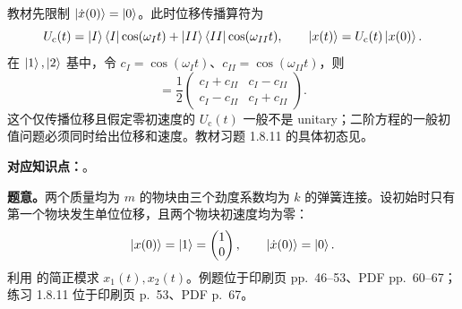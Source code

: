 \begin{checkedsolution}
教材先限制 $\left|\dot x(0)\right\rangle=\left|0\right\rangle$。此时位移传播算符为
\begin{equation}
  U_{\mathrm c}(t)
  =\left|I\right\rangle\left\langle I\right|\cos(\omega_It)
  +\left|II\right\rangle\left\langle II\right|\cos(\omega_{II}t),
  \qquad
  \left|x(t)\right\rangle=U_{\mathrm c}(t)\left|x(0)\right\rangle.
  \label{eq:QM-C01-S08-classical-propagator}
\end{equation}
在 $\left|1\right\rangle,\left|2\right\rangle$ 基中，令 $c_I=\cos(\omega_It)$、$c_{II}=\cos(\omega_{II}t)$，则
\begin{equation}
  [U_{\mathrm c}(t)]
  =\frac12
  \begin{pmatrix}
    c_I+c_{II}&c_I-c_{II}\\
    c_I-c_{II}&c_I+c_{II}
  \end{pmatrix}.
  \label{eq:QM-C01-S08-classical-propagator-matrix}
\end{equation}
这个仅传播位移且假定零初速度的 $U_{\mathrm c}(t)$ 一般不是 unitary；二阶方程的一般初值问题必须同时给出位移和速度。教材习题 1.8.11 的具体初态见。

\end{checkedsolution}


\textbf{对应知识点：}。

\textbf{题意。}两个质量均为 $m$ 的物块由三个劲度系数均为 $k$ 的弹簧连接。设初始时只有第一个物块发生单位位移，且两个物块初速度均为零：
\[
  \left|x(0)\right\rangle=\left|1\right\rangle=\begin{pmatrix}1\\0\end{pmatrix},
  \qquad
  \left|\dot x(0)\right\rangle=\left|0\right\rangle.
\]
利用 的简正模求 $x_1(t),x_2(t)$。例题位于印刷页 pp.~46--53、PDF pp.~60--67；练习 1.8.11 位于印刷页 p.~53、PDF p.~67。


